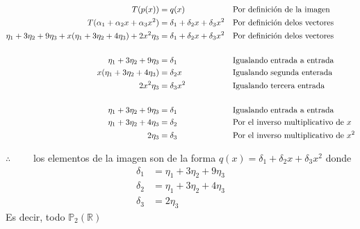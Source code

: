 \documentclass[letterpaper]{article}
\newcommand{\Po}{\mathds{P}_2(\mathds{R})}
\renewcommand{\*}{\cdot}
\theoremstyle{definition}
\begin{document}
\begin{align*}
	T(p(x)) &= q(x) && \text{Por definición de la imagen}\\
	T(\alpha_1 + \alpha_2x + \alpha_3x^2) &= \delta_1 + \delta_2x + \delta_3x^2 && \text{Por definición delos vectores}\\
	 \eta_1 + 3\eta_2 + 9\eta_3 + x(\eta_1 + 3 \eta_2 + 4 \eta_3) + 2 x^2\eta_3 &= \delta_1 + \delta_2x + \delta_3x^2 && \text{Por definición delos vectores}\\
	 \\
	 \eta_1 + 3\eta_2 + 9\eta_3 &= \delta_1 && \text{Igualando entrada a entrada}\\
	x(\eta_1 + 3 \eta_2 + 4 \eta_3) &= \delta_2x  && \text{Igualando segunda enterada}\\
	2x^2\eta_3 &= \delta_3x^2 && \text{Igualando tercera entrada}\\
	 \\
	 \eta_1 + 3\eta_2 + 9\eta_3 &= \delta_1 && \text{Igualando entrada a entrada}\\
	\eta_1 + 3 \eta_2 + 4 \eta_3 &= \delta_2 && \text{Por el inverso multiplicativo de $ x $}\\
	2\eta_3 &= \delta_3 && \text{Por el inverso multiplicativo de $ x^2 $}\\
\end{align*}
\begin{center}
	$ \therefore \qquad $ los elementos de la imagen son de la forma $ q(x) = \delta_1 + \delta_2x + \delta_3x^2 $ donde 
	\begin{align*}
	\delta_1 &= \eta_1 + 3\eta_2 + 9\eta_3 \\
	\delta_2 &= \eta_1 + 3 \eta_2 + 4 \eta_3 \\
	\delta_3  &= 2\eta_3 
	\end{align*}
Es decir, todo $ \Po $
\end{center}
\end{document}
